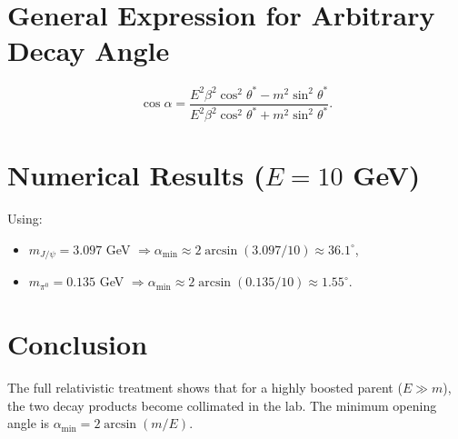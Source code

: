 \documentclass[12pt]{article}
\begin{document}
\section*{General Expression for Arbitrary Decay Angle}

\[
\cos\alpha = \frac{E^2\beta^2\cos^2\theta^* - m^2\sin^2\theta^*}{E^2\beta^2 \cos^2\theta^* + m^2\sin^2\theta^*}.
\]

\section*{Numerical Results ($E = 10$ GeV)}

Using:
\begin{itemize}
\item $m_{J/\psi} = 3.097$ GeV $\Rightarrow \alpha_{\min} \approx 2 \arcsin(3.097/10) \approx 36.1^\circ$,
\item $m_{\pi^0} = 0.135$ GeV $\Rightarrow \alpha_{\min} \approx 2 \arcsin(0.135/10) \approx 1.55^\circ$.
\end{itemize}

\section*{Conclusion}

The full relativistic treatment shows that for a highly boosted parent ($E \gg m$), the two decay products become collimated in the lab. The minimum opening angle is $\alpha_{\min} = 2 \arcsin(m/E)$.
\end{document}
